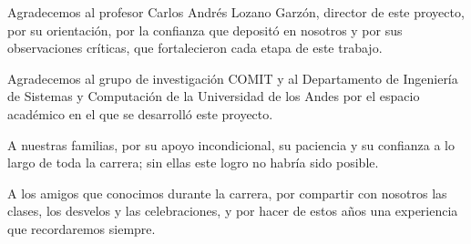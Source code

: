 \documentclass{plantilla-uniandes}
\begin{document}
\cleardoublepage
{}

Agradecemos al profesor Carlos Andrés Lozano Garzón, director de este proyecto, por su orientación, por la confianza que depositó en nosotros y por sus observaciones críticas, que fortalecieron cada etapa de este trabajo.

Agradecemos al grupo de investigación COMIT y al Departamento de Ingeniería de Sistemas y Computación de la Universidad de los Andes por el espacio académico en el que se desarrolló este proyecto.

A nuestras familias, por su apoyo incondicional, su paciencia y su confianza a lo largo de toda la carrera; sin ellas este logro no habría sido posible.

A los amigos que conocimos durante la carrera, por compartir con nosotros las clases, los desvelos y las celebraciones, y por hacer de estos años una experiencia que recordaremos siempre.

\cleardoublepage
\end{document}
